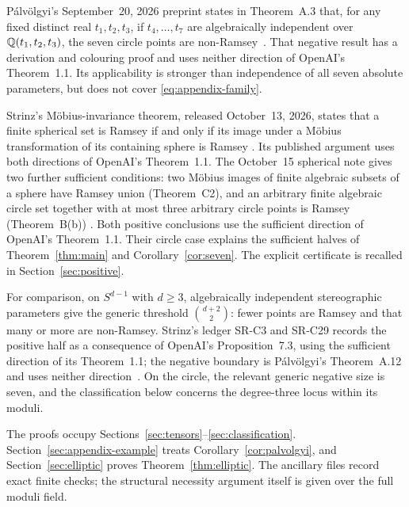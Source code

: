 P\'alv\"olgyi's September~20, 2026 preprint states in Theorem~A.3 that,
for any fixed distinct real $t_1,t_2,t_3$, if $t_4,\ldots,t_7$ are
algebraically independent over $\mathbb Q(t_1,t_2,t_3)$, the seven circle
points are non-Ramsey~\cite{palvolgyi2026}. That negative result has a
derivation and colouring proof and uses neither direction of OpenAI's
Theorem~1.1. Its applicability is stronger than independence of
all seven absolute parameters, but does not cover
\eqref{eq:appendix-family}.

Strinz's M\"obius-invariance theorem, released October~13, 2026,
states that a finite spherical set is Ramsey if and only if its image
under a M\"obius transformation of its containing sphere is Ramsey
\cite[Theorem C]{strinz2026mobius}. Its published argument uses both
directions of OpenAI's Theorem~1.1.
The October~15 spherical note gives two further sufficient conditions:
two M\"obius images of finite algebraic subsets of a sphere have Ramsey
union (Theorem~C2), and an arbitrary finite algebraic circle set together
with at most three arbitrary circle points is Ramsey (Theorem~B(b))
\cite{strinz2026spherical}. Both positive conclusions use the sufficient
direction of OpenAI's Theorem~1.1. Their circle case explains the sufficient halves
of Theorem~\ref{thm:main} and Corollary~\ref{cor:seven}. The explicit
certificate is recalled in Section~\ref{sec:positive}.

For comparison, on $S^{d-1}$ with $d\ge3$, algebraically independent
stereographic parameters give the generic threshold
$\binom{d+2}{2}$: fewer points are Ramsey and that many or more are
non-Ramsey. Strinz's ledger SR-C3 and SR-C29 records the positive half
as a consequence of OpenAI's Proposition~7.3, using the sufficient
direction of its Theorem~1.1; the negative boundary is P\'alv\"olgyi's Theorem~A.12 and
uses neither direction~\cite{strinz2026spherical,palvolgyi2026}.
On the circle, the relevant generic negative size is seven, and the
classification below concerns the degree-three locus within its moduli.

The proofs occupy Sections~\ref{sec:tensors}--\ref{sec:classification}.
Section~\ref{sec:appendix-example} treats Corollary~\ref{cor:palvolgyi},
and Section~\ref{sec:elliptic} proves Theorem~\ref{thm:elliptic}.
The ancillary files record exact finite checks; the structural
necessity argument itself is given over the full moduli field.

